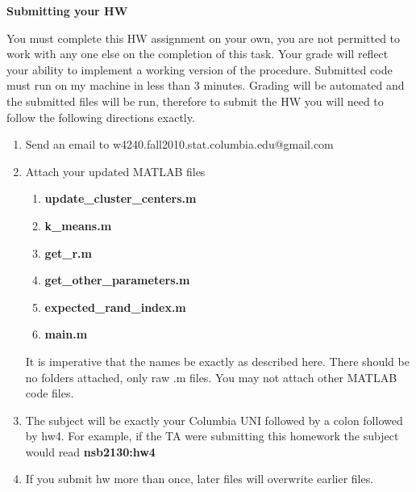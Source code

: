 \documentclass[12pt]{article}
\begin{document}

{\bf Submitting your HW}

You must complete this HW assignment on your own, you are not permitted to work with any one else on the completion of this task.  Your grade will reflect your ability to implement a working version of the procedure.  Submitted code must run on my machine in less than 3 minutes.  Grading will be automated and the submitted files will be run, therefore to submit the HW you will need to follow the following directions exactly.

\begin{enumerate}
	\item Send an email to w4240.fall2010.stat.columbia.edu@gmail.com
	\item {Attach your updated MATLAB files 
		\begin{enumerate}
			\item {\bf update\_cluster\_centers.m} 
			\item	 {\bf k\_means.m}
			\item  {\bf get\_r.m}
			\item {\bf get\_other\_parameters.m}
			\item  {\bf expected\_rand\_index.m}
			\item  {\bf main.m}
		\end{enumerate} It is imperative that the names be exactly as described here. There should be no folders attached, only raw .m files.  You may not attach other MATLAB code files. }
	\item The subject will be exactly your Columbia UNI followed by a colon followed by hw4.  For example, if the TA were submitting this homework the subject would read {\bf nsb2130:hw4}
	\item If you submit hw more than once, later files will overwrite earlier files.
\end{enumerate}


\problemsdone
\end{document}
